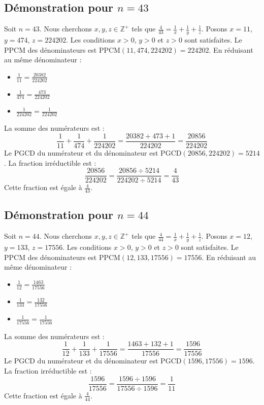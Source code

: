 \documentclass[11pt,a4paper]{article}
\begin{document}
\subsection{Démonstration pour $n = 43$}
Soit $n = 43$. Nous cherchons $x, y, z \in \mathbb{Z}^{+}$ tels que $\frac{4}{43} = \frac{1}{x} + \frac{1}{y} + \frac{1}{z}$.
Posons $x = 11$, $y = 474$, $z = 224202$.
Les conditions $x > 0$, $y > 0$ et $z > 0$ sont satisfaites.
Le PPCM des dénominateurs est $\text{PPCM}(11, 474, 224202) = 224202$.
En réduisant au même dénominateur :
\begin{itemize}
    \item $\frac{1}{11} = \frac{20382}{224202}$
    \item $\frac{1}{474} = \frac{473}{224202}$
    \item $\frac{1}{224202} = \frac{1}{224202}$
\end{itemize}
La somme des numérateurs est :
$$ \frac{1}{11} + \frac{1}{474} + \frac{1}{224202} = \frac{20382 + 473 + 1}{224202} = \frac{20856}{224202} $$
Le PGCD du numérateur et du dénominateur est $\text{PGCD}(20856, 224202) = 5214$.
La fraction irréductible est :
$$ \frac{20856}{224202} = \frac{20856 \div 5214}{224202 \div 5214} = \frac{4}{43} $$
Cette fraction est égale à $\frac{4}{43}$.

\subsection{Démonstration pour $n = 44$}
Soit $n = 44$. Nous cherchons $x, y, z \in \mathbb{Z}^{+}$ tels que $\frac{4}{44} = \frac{1}{x} + \frac{1}{y} + \frac{1}{z}$.
Posons $x = 12$, $y = 133$, $z = 17556$.
Les conditions $x > 0$, $y > 0$ et $z > 0$ sont satisfaites.
Le PPCM des dénominateurs est $\text{PPCM}(12, 133, 17556) = 17556$.
En réduisant au même dénominateur :
\begin{itemize}
    \item $\frac{1}{12} = \frac{1463}{17556}$
    \item $\frac{1}{133} = \frac{132}{17556}$
    \item $\frac{1}{17556} = \frac{1}{17556}$
\end{itemize}
La somme des numérateurs est :
$$ \frac{1}{12} + \frac{1}{133} + \frac{1}{17556} = \frac{1463 + 132 + 1}{17556} = \frac{1596}{17556} $$
Le PGCD du numérateur et du dénominateur est $\text{PGCD}(1596, 17556) = 1596$.
La fraction irréductible est :
$$ \frac{1596}{17556} = \frac{1596 \div 1596}{17556 \div 1596} = \frac{1}{11} $$
Cette fraction est égale à $\frac{4}{44}$.
\end{document}
